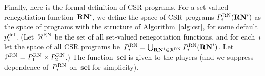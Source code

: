\documentclass[sigconf]{aamas}
\newcommand{\allprogreneg}{\allprog^{\text{RN}}}
\newcommand{\selection}{sel}%
\newcommand{\renegb}{\mathbf{\selection}}
\theoremstyle{definition}
\begin{document}





Finally, here 
is the formal definition of CSR
programs. For a
set-valued
renegotiation
function~$\mathbf{RN}^{i}$,
we define
the space of
CSR
programs
$P_i^{\textnormal{RN}}(\mathbf{RN}^{i})$
as the
space of programs
with the structure
of
Algorithm~\ref{alg:csr},
for some default~$p_i^{\textnormal{def}}$.
(Let~$\mathcal{R}^{\textnormal{RN}}$ be the set of all
set-valued renegotiation 
functions,
and for each~$i$
let the space of all
CSR
programs be~$P_i^{\textnormal{RN}} = \bigcup_{\mathbf{RN}^{i} \in \mathcal{R}^{\textnormal{RN}}} P_i^{\textnormal{RN}}(\mathbf{RN}^{i})$.
 Let $\allprogreneg = \fullfsspaceone \times \fullfsspacetwo$.)
The \selfunction{} function~$\renegb$
is given to
the players
(and we suppress dependence of~$P_i^{\textnormal{RN}}$ on~$\renegb$ for simplicity).
\end{document}
